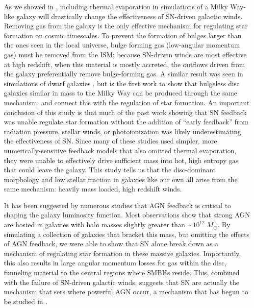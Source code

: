 As we showed in \citet{Keller2015}, including thermal evaporation in simulations
of a Milky Way-like galaxy will drastically change the effectiveness of
SN-driven galactic winds.  Removing gas from the galaxy is the only effective
mechanism for regulating star formation on cosmic timescales.  To prevent the
formation of bulges larger than the ones seen in the local universe, bulge
forming gas (low-angular momentum gas) must be removed from the ISM; because
SN-driven winds are most effective at high redshift, when this material is
mostly accreted, the outflows driven from the galaxy preferentially remove
bulge-forming gas.  A similar result was seen in simulations of dwarf galaxies
\citep{Governato2010, Brook2011}, but \citet{Keller2015} is the first work to
show that bulgeless disc galaxies similar in mass to the Milky Way can be
produced through the same mechanism, and connect this with the regulation of
star formation.  An important conclusion of this study is that much of the past
work \citep{Stinson2013,Agertz2013,Hopkins2014} showing that SN feedback was
unable regulate star formation without the addition of ``early feedback'' from
radiation pressure, stellar winds, or photoionization was likely underestimating
the effectiveness of SN.  Since many of these studies used simpler, more
numerically-sensitive feedback models that also omitted thermal evaporation,
they were unable to effectively drive sufficient mass into hot, high
entropy gas that could leave the galaxy.  This study tells us that the
disc-dominant morphology and low stellar fraction in galaxies like our own all
arise from the same mechanism:  heavily mass loaded, high redshift winds.

It has been suggested by numerous studies \citep{Benson2003,Bower2006} that AGN
feedback is critical to shaping the galaxy luminosity function.  Most
observations \citep{Kauffmann2003b} show that strong AGN are hosted in galaxies
with halo masses slightly greater than $\sim10^{12}\;M_\odot$.  By simulating a
collection of galaxies that bracket this mass, but omitting the effects of AGN
feedback, we were able to show that SN alone break down as a mechanism of
regulating star formation in these massive galaxies.  Importantly, this also
results in large angular momentum losses for gas within the disc, funneling
material to the central regions where SMBHs reside.  This, combined with the
failure of SN-driven galactic winds, suggests that SN are actually the mechanism
that sets where powerful AGN occur, a mechanism that has begun to be studied in
\citet{Bower2016}.


